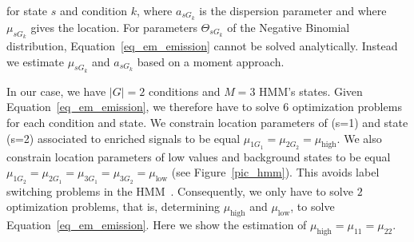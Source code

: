 \noindent for state $s$ and condition $k$, where $a_{sG_k}$ is the dispersion parameter and where $\mu_{sG_k}$ gives the location.
For parameters $\Theta_{sG_k}$ of the Negative Binomial distribution, Equation~\ref{eq_em_emission} cannot be solved analytically.
Instead we estimate $\mu_{sG_k}$ and $a_{sG_k}$ based on a moment approach.

In our case, we have $|G|=2$ conditions and $M=3$ HMM's states.
Given Equation~\ref{eq_em_emission}, we therefore have to solve $6$ optimization problems for each condition and state.
We constrain location parameters of  (s=1) and state  (s=2) associated to enriched signals to be equal $\mu_{1G_1}=\mu_{2G_2}=\mu_{\text{high}}$. 
We also constrain location parameters of low values and background states to be equal $\mu_{1G_2}=\mu_{2G_1}=\mu_{3G_1}=\mu_{3G_2}=\mu_{\text{low}}$ (see Figure~\ref{pic_hmm}).
This avoids label switching problems in the HMM~\citep{rabiner1989}.
Consequently, we only have to solve $2$ optimization problems, that is, determining $\mu_{\text{high}}$ and $\mu_{\text{low}}$, to solve Equation~\ref{eq_em_emission}.
Here we show the estimation of $\mu_{\text{high}} = \mu_{11} = \mu_{22}$.

